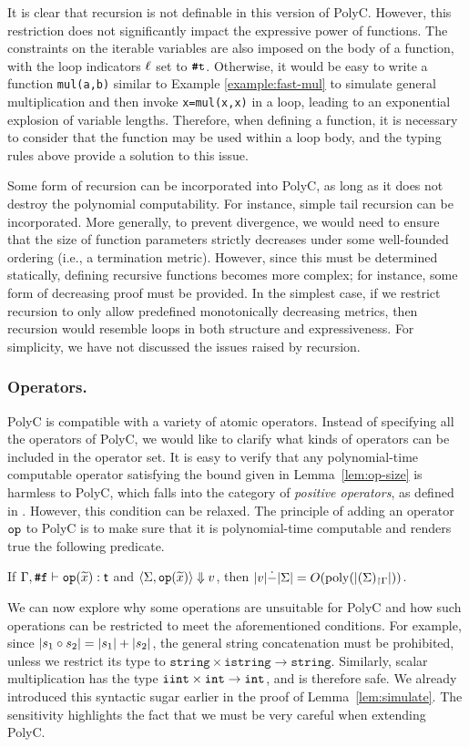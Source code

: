 \documentclass[runningheads]{llncs}
\begin{document}
It is clear that recursion is not definable in this version of PolyC.
However, this restriction does not significantly impact the expressive power of functions.
The constraints on the iterable variables are also imposed on the body of a function, with the loop indicators $\ell$ set to $\texttt{\#}\mathtt{t}$.
Otherwise, it would be easy to write a function \texttt{mul(a,b)} similar to Example \ref{example:fast-mul} to simulate general multiplication and then invoke \texttt{x=mul(x,x)} in a loop, leading to an exponential explosion of variable lengths.
Therefore, when defining a function, it is necessary to consider that the function may be used within a loop body, and the typing rules above provide a solution to this issue.

Some form of recursion can be incorporated into PolyC, as long as it does not destroy the polynomial computability. 
For instance, simple tail recursion can be incorporated.
More generally, to prevent divergence, we would need to ensure that the size of function parameters strictly decreases under some well-founded ordering (i.e., a termination metric). 
However, since this must be determined statically, defining recursive functions becomes more complex; for instance, some form of decreasing proof must be provided. 
In the simplest case, if we restrict recursion to only allow predefined monotonically decreasing metrics, then recursion would resemble loops in both structure and expressiveness. 
For simplicity, we have not discussed the issues raised by recursion.

\subsubsection{Operators.}
PolyC is compatible with a variety of atomic operators.
Instead of specifying all the operators of PolyC, we would like to clarify what kinds of operators can be included in the operator set.
It is easy to verify that any polynomial-time computable operator satisfying the bound given in Lemma~\ref{lem:op-size} is harmless to PolyC, which falls into the category of \textit{positive operators}, as defined in \cite{hainry2023general}.
However, this condition can be relaxed.
The principle of adding an operator $\mathtt{op}$ to PolyC is to make sure that it is polynomial-time computable and renders true the following predicate.
\begin{center}
    If $\Gamma,\texttt{\#}\mathtt{f}\vdash\mathtt{op}(\widetilde{x}):\mathsf{t}$ and $\langle\Sigma,\mathtt{op}(\widetilde{x})\rangle\Downarrow{v}$, then $\vert v\vert\dot{-}\vert\Sigma\vert=O(\mathrm{poly}(\vert{(\Sigma)_{\restriction \Gamma}}\vert))$.
\end{center}
We can now explore why some operations are unsuitable for PolyC and how such operations can be restricted to meet the aforementioned conditions.
For example, since $\vert s_1 \circ s_2\vert = \vert s_1\vert + \vert s_2\vert$, the general string concatenation must be prohibited, unless we restrict its type to $\mathtt{string}\times\mathtt{istring}\to\mathtt{string}$.
Similarly, scalar multiplication has the type $\mathtt{iint} \times \mathtt{int} \to \mathtt{int}$, and is therefore safe. 
We already introduced this syntactic sugar earlier in the proof of Lemma~\ref{lem:simulate}.
The sensitivity highlights the fact that we must be very careful when extending PolyC.
\end{document}
